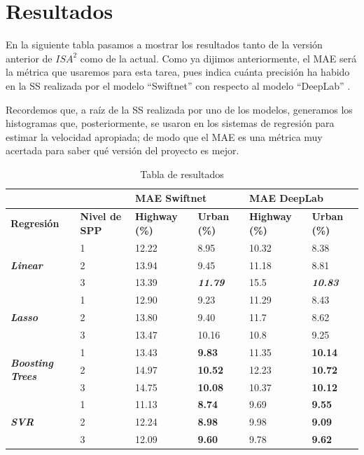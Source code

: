 \chapter{Resultados}

En la siguiente tabla pasamos a mostrar los resultados tanto de la versión anterior de $ISA^{2}$ como de la actual. Como ya dijimos anteriormente, el \ac{MAE} será la métrica que usaremos para esta tarea, pues indica cuánta precisión ha habido en la \ac{SS} realizada por el modelo ``Swiftnet'' \cite{swiftnet} con respecto al modelo ``DeepLab'' \cite{deeplab}.

Recordemos que, a raíz de la \ac{SS} realizada por uno de los modelos, generamos los histogramas que, posteriormente, se usaron en los sistemas de regresión para estimar la velocidad apropiada; de modo que el \ac{MAE} es una métrica muy acertada para saber qué versión del proyecto es mejor.

\begin{table}[H]
\begin{tabular}{|l|l|l|l|l|l|}\hline
& & \multicolumn{2}{|l|}{\textbf{MAE Swiftnet}} & \multicolumn{2}{|l|}{\textbf{MAE DeepLab}} \\ \hline
\textbf{Regresión} & \textbf{Nivel de \ac{SPP}} & \textbf{Highway (\%)} & \textbf{Urban (\%)} & \textbf{Highway (\%)} & \textbf{Urban (\%)}\\ \hline
\multirow{3}{*}{\textbf{\textit{Linear}}} & 1 & 12.22 & 8.95 & 10.32 & 8.38 \\ \cline{2-6}
& 2 & 13.94 & 9.45 & 11.18 & 8.81 \\ \cline{2-6}
& 3 & 13.39 & \textbf{\textit{11.79}} & 15.5 & \textbf{\textit{10.83}}\\ \hline
\multirow{3}{*}{\textbf{\textit{Lasso}}} & 1 & 12.90 & 9.23 & 11.29 & 8.43 \\ \cline{2-6}
 & 2 & 13.80 & 9.40 & 11.7 & 8.62 \\ \cline{2-6}
 & 3 & 13.47 & 10.16 & 10.8 & 9.25\\ \hline
\multirow{3}{*}{\textbf{\textit{Boosting Trees}}} & 1 & 13.43 & \textbf{9.83} & 11.35 & \textbf{10.14} \\ \cline{2-6}
 & 2 & 14.97 & \textbf{10.52} & 12.23 & \textbf{10.72}\\ \cline{2-6}
 & 3 & 14.75 & \textbf{10.08} & 10.37 & \textbf{10.12}\\ \hline
\multirow{3}{*}{\textbf{\textit{SVR}}} & 1 & 11.13 & \textbf{8.74} & 9.69 & \textbf{9.55} \\ \cline{2-6}
 & 2 & 12.24 & \textbf{8.98} & 9.98 & \textbf{9.09}\\ \cline{2-6}
 & 3 & 12.09 & \textbf{9.60} & 9.78 & \textbf{9.62}\\ \hline
\end{tabular}
\caption{Tabla de resultados}
\label{tabla:Resul}
\end{table}


